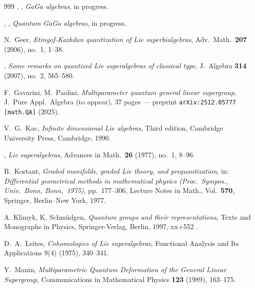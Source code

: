 \documentclass[12pt,reqno,twoside,a4paper]{amsart}
\numberwithin{equation}{section}
\theoremstyle{definition}
\newtheorem{free text}[lema]{}
\theoremstyle{remark}
\theoremstyle{plain}
\begin{document}
\begin{thebibliography}{999}
  \bysame , \bysame ,
  \textit{GaGa algebras},  in progress.

\vskip7pt

  \bysame , \bysame ,
  \textit{Quantum GaGa algebras},  in progress.

\vskip7pt

  {\sc N.\ Geer},
  \textit{Etingof-Kazhdan quantization of Lie superbialgebras},
  Adv.\ Math.\  \textbf{207}  (2006), no.\ 1, 1--38.

\vskip7pt

  \bysame ,
  {\it Some remarks on quantized Lie superalgebras of classical type},
J.\ Algebra  \textbf{314}  (2007), no.\ 2, 565--580.

\vskip7pt

  {\sc F.\ Gavarini},  {\sc M.\ Paolini},
  \textit{Multiparameter quantum general linear supergroup},  J.\ Pure Appl.\ Algebra (to appear), 37 pages   ---   preprint  \texttt{arXiv:2512.05777 [math.QA]}  (2025).

\vskip7pt

  {\sc V.\ G.\ Kac},
   \textit{Infinite dimensional Lie algebras},  Third edition, Cambridge University Press, Cambridge, 1990.

\vskip7pt

  \bysame ,
   \textit{Lie superalgebras},  Advances in Math.\  {\bf 26}  (1977), no.\ 1, 8--96.

\vskip7pt

  {\sc B.\ Kostant},
   \textit{Graded manifolds, graded Lie theory, and prequantization},  in:  \textsl{Differential geometrical methods in mathematical physics (Proc.\ Sympos., Univ.\ Bonn, Bonn,\ 1975)},  pp.\ 177--306, Lecture Notes in Math.,  Vol.\ \textbf{570},  Springer, Berlin--New York, 1977.

\vskip7pt

  {\sc A. Klimyk},  {\sc K. Schm\"udgen},
  \textit{Quantum groups and their representations},
  Texts and Monographs in Physics, Springer-Verlag, Berlin, 1997, {\rm xx}+552 .

\vskip7pt

  {\sc D.\ A.\ Leites},
{\it Cohomologies of Lie superalgebras},  Functional Analysis and Its Applications 9(4) (1975), 340--341.

\vskip7pt

  {\sc Y.\ Manin},
  \textit{Multiparametric Quantum Deformation of the General Linear Supergroup},
  Communications in Mathematical Physics  {\bf 123}  (1989), 163--175.


\end{thebibliography}
\end{document}
